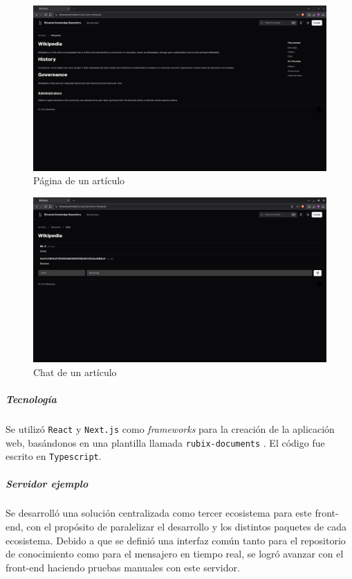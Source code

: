 \begin{figure}[H]
    \centering
    \includegraphics[width=1\linewidth]{img/frontends/article-page.png}
    \caption{Página de un artículo}
    \label{fig:astraweb-article-page}
\end{figure}

\begin{figure}[H]
    \centering
    \includegraphics[width=1\linewidth]{img/frontends/astraweb-chat.png}
    \caption{Chat de un artículo}
    \label{fig:astraweb-chat}
\end{figure}

\subparagraph{Tecnología} Se utilizó \texttt{React} \cite{react} y \texttt{Next.js} \cite{next} como \textit{frameworks} para la creación de la aplicación web, basándonos en una plantilla llamada \texttt{rubix-documents} \cite{rubix}. El código fue escrito en \texttt{Typescript}.

\subparagraph{Servidor ejemplo} Se desarrolló una solución centralizada como tercer ecosistema para este front-end, con el propósito de paralelizar el desarrollo y los distintos paquetes de cada ecosistema. Debido a que se definió una interfaz común tanto para el repositorio de conocimiento como para el mensajero en tiempo real, se logró avanzar con el front-end haciendo pruebas manuales con este servidor.

